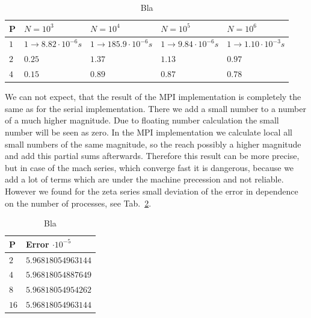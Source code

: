 \begin{table}
\centering
    \begin{tabular}{| l | l | l | l | l |}
    
    \hline
    P & $N = 10^3$ & $N = 10^4$ & $N = 10^5$ & $N = 10^6$\\  \hline
	$1$ & $1 \rightarrow 8.82 \cdot 10^{-6} s$ & $1 \rightarrow 185.9 \cdot 10^{-6} s$ & $1 \rightarrow 9.84 \cdot 10^{-6} s$ & $1 \rightarrow 1.10 \cdot 10^{-3} s$\\    
    $2$ & $0.25$ & $1.37$ & $1.13$ &$0.97$ \\
    $4$ & $0.15$ & $0.89$ & $0.87$ &$0.78$ \\
    \hline
    
    \end{tabular}
    \caption{Bla}
    \label{tab:speed_up1_mpi}
\end{table}


We can not expect, that the result of the MPI implementation is completely the same as for the serial implementation. There we add a small number to a number of a much higher magnitude. Due to floating number calculation the small number will be seen as zero. In the MPI implementation we calculate local all small numbers of the same magnitude, so the reach possibly a higher magnitude and add this partial sums afterwards. Therefore this result can be more precise, but in case of the mach series, which converge fast it is dangerous, because we add a lot of terms which are under the machine precession and not reliable. However we found for the zeta series small deviation of the error in dependence on the number of processes, see Tab.~\ref{tab:error_dev}.
\begin{table}
\centering
    \begin{tabular}{| l | l |}
    
    \hline
    P & Error $\cdot 10^{-5}$ \\  \hline
    $2$ & $5.96818054963144$ \\
    $4$ & $5.96818054887649$ \\
    $8$ & $5.96818054954262$ \\    
    $16$ & $5.96818054963144$ \\
    \hline
    
    \end{tabular}
    \caption{Bla}
    \label{tab:error_dev}
\end{table}





